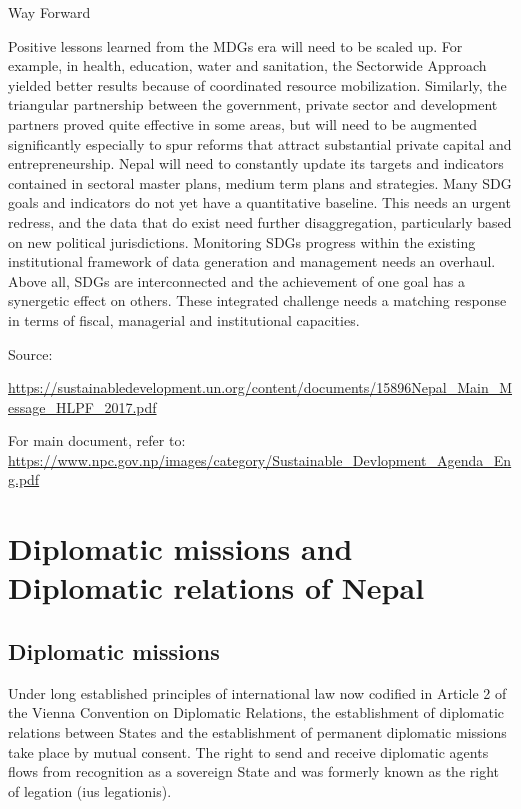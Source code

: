 \documentclass[
  openany]{book}
\begin{document}
Way Forward

Positive lessons learned from the MDGs era will need to be scaled up. For example, in health, education, water and sanitation, the Sectorwide Approach yielded better results because of coordinated resource mobilization. Similarly, the triangular partnership between the government, private sector and development partners proved quite effective in some areas, but will need to be augmented significantly especially to spur reforms that attract substantial private capital and entrepreneurship. Nepal will need to constantly update its targets and indicators contained in sectoral master plans, medium term plans and strategies. Many SDG goals and indicators do not yet have a quantitative baseline. This needs an urgent redress, and the data that do exist need further disaggregation, particularly based on new political jurisdictions. Monitoring SDGs progress within the existing institutional framework of data generation and management needs an overhaul. Above all, SDGs are interconnected and the achievement of one goal has a synergetic effect on others. These integrated challenge needs a matching response in terms of fiscal, managerial and institutional capacities.

Source:

\url{https://sustainabledevelopment.un.org/content/documents/15896Nepal_Main_Message_HLPF_2017.pdf}

For main document, refer to: \url{https://www.npc.gov.np/images/category/Sustainable_Devlopment_Agenda_Eng.pdf}

\hypertarget{diplomatic-missions-and-diplomatic-relations-of-nepal}{%
\chapter{Diplomatic missions and Diplomatic relations of Nepal}\label{diplomatic-missions-and-diplomatic-relations-of-nepal}}

\hypertarget{diplomatic-missions}{%
\section{Diplomatic missions}\label{diplomatic-missions}}

Under long established principles of international law now codified in Article 2 of the Vienna Convention on Diplomatic Relations, the establishment of diplomatic relations between States and the establishment of permanent diplomatic missions take place by mutual consent. The right to send and receive diplomatic agents flows from recognition as a sovereign State and was formerly known as the right of legation (ius legationis).
\end{document}
